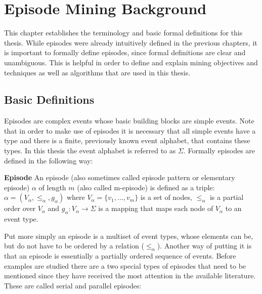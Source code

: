 \chapter{Episode Mining Background}
\label{chapter_background}

\ifpdf
    \graphicspath{{Chapter3/Figs/Raster/}{Chapter3/Figs/PDF/}{Chapter3/Figs/}}
\else
    \graphicspath{{Chapter3/Figs/Vector/}{Chapter3/Figs/}}
\fi

This chapter establishes the terminology and basic formal definitions for this thesis. While episodes were already intuitively defined in the previous chapters, it is important to formally define episodes, since formal definitions are clear and unambiguous. This is helpful in order to define and explain mining objectives and techniques as well as algorithms that are used in this thesis. 

\section{Basic Definitions}
\label{sec_basicEpisodeDefinitions}
Episodes are complex events whose basic building blocks are simple events. Note that in order to make use of episodes it is necessary that all simple events have a type and there is a finite, previously known event alphabet, that contains these types. In this thesis the event alphabet is referred to as $\Sigma$. Formally episodes are defined in the following way:

\begin{mydef}
\label{def_episode}
\textbf{Episode} An episode (also sometimes called episode pattern or elementary episode) $\alpha$ of length $m$ (also called m-episode) is defined as a triple: $\alpha = (V_\alpha,{\leq}_{\alpha},g_\alpha)$ where $V_\alpha = \{v_1,...,v_m\}$ is a set of nodes, ${\leq}_{\alpha}$ is a partial order over $V_\alpha$ and $g_\alpha : V_\alpha \rightarrow \Sigma$ is a mapping that maps each node of $V_\alpha$ to an event type. \cite{mannila1995discovering}
\end{mydef}

Put more simply an episode is a multiset of event types, whose elements can be, but do not have to be ordered by a relation (${\leq}_{\alpha}$). Another way of putting it is that an episode is essentially a partially ordered sequence of events. Before examples are studied there are a two special types of episodes that need to be mentioned since they have received the most attention in the available literature. These are called serial and parallel episodes:

